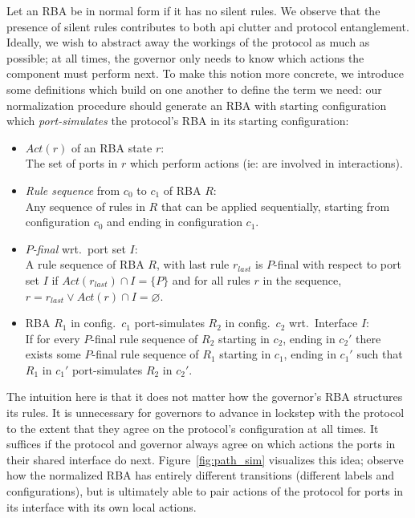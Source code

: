 Let an RBA be in normal form if it has no silent rules. We observe that the presence of silent rules contributes to both api clutter and protocol entanglement. Ideally, we wish to abstract away the workings of the protocol as much as possible; at all times, the governor only needs to know which actions the component must perform next. To make this notion more concrete, we introduce some definitions which build on one another to define the term we need: our normalization procedure should generate an RBA with starting configuration which \textit{port-simulates} the protocol's RBA in its starting configuration:
\begin{itemize}
	\item $Act(r)$ of an RBA state $r$:\\
	The set of ports in $r$ which perform actions (ie: are involved in interactions).
	
	\item \textit{Rule sequence} from $c_0$ to $c_1$ of RBA $R$:\\
	Any sequence of rules in $R$ that can be applied sequentially, starting from configuration $c_0$ and ending in configuration $c_1$.
	
	\item \textit{$P$-final} wrt.\ port set $I$:\\
	A rule sequence of RBA $R$, with last rule $r_{last}$ is $P$-final with respect to port set $I$ if $Act(r_{last})\cap{}I=\{P\}$ and for all rules $r$ in the sequence, $r=r_{last} \lor{} Act(r)\cap{}I=\varnothing$.	
	
	\item RBA $R_1$ in config.\ $c_1$ port-simulates $R_2$ in config.\ $c_2$ wrt.\ Interface $I$:\\
	If for every $P$-final rule sequence of $R_2$ starting in $c_2$, ending in $c_2'$ there exists some $P$-final rule sequence of $R_1$ starting in $c_1$, ending in $c_1'$ such that $R_1$ in $c_1'$ port-simulates $R_2$ in $c_2'$.
\end{itemize}

The intuition here is that it does not matter how the governor's RBA structures its rules. It is unnecessary for governors to advance in lockstep with the protocol to the extent that they agree on the protocol's configuration at all times. It suffices if the protocol and governor always agree on which actions the ports in their shared interface do next. Figure~\ref{fig:path_sim} visualizes this idea; observe how the normalized RBA has entirely different transitions (different labels and configurations), but is ultimately able to pair actions of the protocol for ports in its interface with its own local actions.

